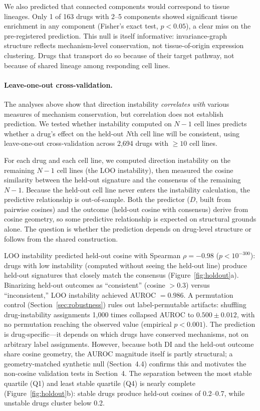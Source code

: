 \documentclass[11pt]{article}
\begin{document}
We also predicted that connected components would correspond to
tissue lineages. Only 1 of 163 drugs with 2--5 components showed
significant tissue enrichment in any component (Fisher's exact test,
$p < 0.05$), a clear miss on the pre-registered prediction.
This null is itself informative: invariance-graph structure reflects
mechanism-level conservation, not tissue-of-origin expression
clustering. Drugs that transport do so because of their target
pathway, not because of shared lineage among responding cell lines.

\paragraph{Leave-one-out cross-validation.}
\label{sec:holdout}

The analyses above show that direction instability \emph{correlates
with} various measures of mechanism conservation, but correlation does
not establish prediction. We tested whether instability computed on
$N{-}1$ cell lines predicts whether a drug's effect on the held-out
$N$th cell line will be consistent, using leave-one-out cross-validation
across 2{,}694 drugs with $\geq 10$ cell lines.

For each drug and each cell line, we computed direction instability on
the remaining $N{-}1$ cell lines (the LOO instability), then measured
the cosine similarity between the held-out signature and the consensus
of the remaining $N{-}1$. Because the held-out cell line never enters
the instability calculation, the predictive relationship is
out-of-sample. Both the predictor ($D$, built from pairwise cosines)
and the outcome (held-out cosine with consensus) derive from cosine
geometry, so some predictive relationship is expected on structural
grounds alone. The question is whether the prediction depends on
drug-level structure or follows from the shared construction.

LOO instability predicted held-out cosine with Spearman $\rho = -0.98$
($p < 10^{-300}$): drugs with low instability (computed without seeing
the held-out line) produce held-out signatures that closely match the
consensus (Figure~\ref{fig:holdout}a). Binarizing held-out outcomes as
``consistent'' (cosine $> 0.3$) versus ``inconsistent,'' LOO instability
achieved AUROC $= 0.986$. A permutation control
(Section~\ref{sec:robustness}) rules out label-permutable artifacts:
shuffling drug-instability assignments 1{,}000 times collapsed AUROC to
$0.500 \pm 0.012$, with no permutation reaching the observed value
(empirical $p < 0.001$). The prediction is drug-specific---it depends on
which drugs have conserved mechanisms, not on arbitrary label
assignments.  However, because both DI and the held-out outcome share
cosine geometry, the AUROC magnitude itself is partly structural; a
geometry-matched synthetic null (Section~4.4) confirms this and motivates
the non-cosine validation tests in Section~4. The separation between the most stable
quartile (Q1) and least stable quartile (Q4) is nearly complete
(Figure~\ref{fig:holdout}b): stable drugs produce held-out cosines of
0.2--0.7, while unstable drugs cluster below 0.2.
\end{document}
